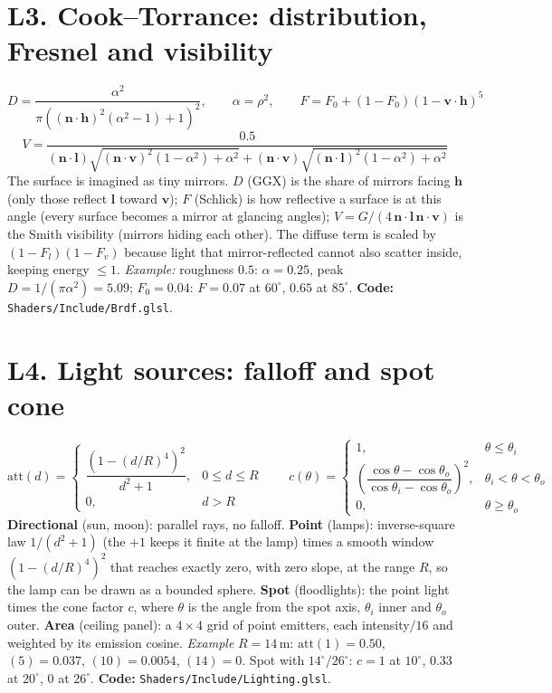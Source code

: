 \documentclass[11pt,a4paper]{article}
\newcommand{\code}[1]{{\small\texttt{#1}}}
\begin{document}
\section{L3. Cook--Torrance: distribution, Fresnel and visibility}
\[D=\frac{\alpha^{2}}{\pi\left((\mathbf n\cdot\mathbf h)^{2}(\alpha^{2}-1)+1\right)^{2}},\qquad \alpha=\rho^{2},\qquad F=F_0+(1-F_0)\left(1-\mathbf v\cdot\mathbf h\right)^{5}\]
\[V=\frac{0.5}{(\mathbf n\cdot\mathbf l)\sqrt{(\mathbf n\cdot\mathbf v)^{2}(1-\alpha^{2})+\alpha^{2}}+(\mathbf n\cdot\mathbf v)\sqrt{(\mathbf n\cdot\mathbf l)^{2}(1-\alpha^{2})+\alpha^{2}}}\]
The surface is imagined as tiny mirrors. $D$ (GGX) is the share of mirrors facing $\mathbf h$ (only those reflect $\mathbf l$ toward $\mathbf v$); $F$ (Schlick) is how reflective a surface is at this angle (every surface becomes a mirror at glancing angles); $V=G/(4\,\mathbf n\cdot\mathbf l\,\mathbf n\cdot\mathbf v)$ is the Smith visibility (mirrors hiding each other). The diffuse term is scaled by $(1-F_l)(1-F_v)$ because light that mirror-reflected cannot also scatter inside, keeping energy $\le1$. \emph{Example:} roughness $0.5$: $\alpha=0.25$, peak $D=1/(\pi\alpha^2)=5.09$; $F_0=0.04$: $F=0.07$ at $60^{\circ}$, $0.65$ at $85^{\circ}$. \textbf{Code:} \code{Shaders/Include/Brdf.glsl}.

\section{L4. Light sources: falloff and spot cone}
\[\mathrm{att}(d)=\begin{cases}\dfrac{\left(1-(d/R)^{4}\right)^{2}}{d^{2}+1},&0\le d\le R\\[8pt]0,&d>R\end{cases}\qquad c(\theta)=\begin{cases}1,&\theta\le\theta_i\\[2pt]\left(\dfrac{\cos\theta-\cos\theta_o}{\cos\theta_i-\cos\theta_o}\right)^{2},&\theta_i<\theta<\theta_o\\[8pt]0,&\theta\ge\theta_o\end{cases}\]
\textbf{Directional} (sun, moon): parallel rays, no falloff. \textbf{Point} (lamps): inverse-square law $1/(d^2+1)$ (the $+1$ keeps it finite at the lamp) times a smooth window $(1-(d/R)^4)^2$ that reaches exactly zero, with zero slope, at the range $R$, so the lamp can be drawn as a bounded sphere. \textbf{Spot} (floodlights): the point light times the cone factor $c$, where $\theta$ is the angle from the spot axis, $\theta_i$ inner and $\theta_o$ outer. \textbf{Area} (ceiling panel): a $4\times4$ grid of point emitters, each intensity$/16$ and weighted by its emission cosine. \emph{Example} $R=14$\,m: $\mathrm{att}(1)=0.50$, $(5)=0.037$, $(10)=0.0054$, $(14)=0$. Spot with $14^{\circ}/26^{\circ}$: $c=1$ at $10^{\circ}$, $0.33$ at $20^{\circ}$, $0$ at $26^{\circ}$. \textbf{Code:} \code{Shaders/Include/Lighting.glsl}.
\end{document}
